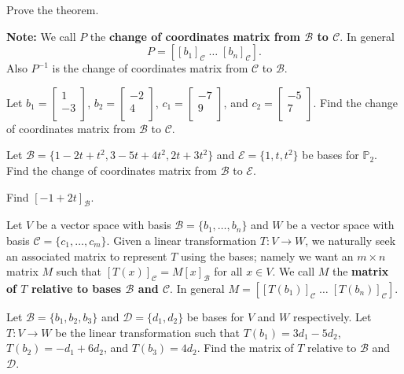 \begin{enumerate}
\Problem Prove the theorem.

\vfill

\newpage

{\bf Note:} We call $P$ the {\bf change of coordinates matrix from $\mathcal{B}$ to $\mathcal{C}$}. In general $$P= [[b_1]_\mathcal{C} \; \dots \; [b_n]_\mathcal{C}].$$ Also $P^{-1}$ is the change of coordinates matrix from $\mathcal{C}$ to $\mathcal{B}$.

\Problem Let $b_1=\begin{bmatrix} 1\\ -3\\ \end{bmatrix}$, $b_2=\begin{bmatrix} -2\\ 4\\ \end{bmatrix}$, $c_1=\begin{bmatrix} -7\\ 9\\ \end{bmatrix}$, and $c_2=\begin{bmatrix} -5\\ 7\\ \end{bmatrix}$. Find the change of coordinates matrix from $\mathcal{B}$ to $\mathcal{C}$.

\vfill

\Problem Let $\mathcal{B}=\{1-2t+t^2, 3-5t+4t^2,2t+3t^2\}$ and $\mathcal{E}=\{1, t, t^2\}$ be bases for $\mathbb{P}_2$. Find the change of coordinates matrix from $\mathcal{B}$ to $\mathcal{E}$.

\vfill

\Problem Find $[-1+2t]_\mathcal{B}$.

\vfill

\newpage

Let $V$ be a vector space with basis $\mathcal{B}=\{b_1, \dots, b_n\}$ and $W$ be a vector space with basis $\mathcal{C}=\{c_1, \dots, c_m\}$. Given a linear transformation $T: V\to W$, we naturally seek an associated matrix to represent $T$ using the bases; namely we want an $m\times n$ matrix $M$ such that $[T(x)]_\mathcal{C}=M [x]_\mathcal{B}$ for all $x \in V$. We call $M$ the {\bf matrix of $T$ relative to bases $\mathcal{B}$ and $\mathcal{C}$}. In general $M= [[T(b_1)]_\mathcal{C} \; \dots \; [T(b_n)]_\mathcal{C}]$.

\Problem Let $\mathcal{B}=\{b_1, b_2, b_3\}$ and $\mathcal{D}=\{d_1, d_2\}$ be bases for $V$ and $W$ respectively. Let $T: V \to W$ be the linear transformation such that $T(b_1)=3d_1-5d_2$, $T(b_2)=-d_1+6d_2$, and $T(b_3)=4d_2$. Find the matrix of $T$ relative to $\mathcal{B}$ and $\mathcal{D}$.

\vfill


\end{enumerate}

